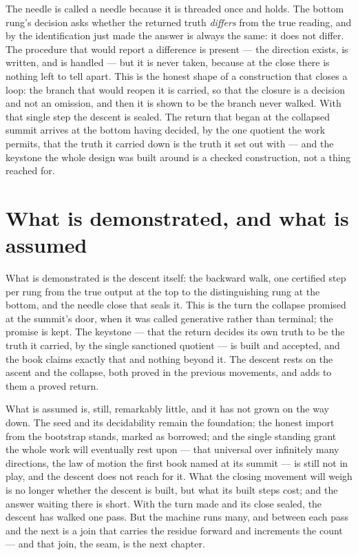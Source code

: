 The needle is called a needle because it is threaded once and holds. The bottom rung's decision asks
whether the returned truth \emph{differs} from the true reading, and by the identification just made the
answer is always the same: it does not differ. The procedure that would report a difference is present ---
the direction exists, is written, and is handled --- but it is never taken, because at the close there is
nothing left to tell apart. This is the honest shape of a construction that closes a loop: the branch that
would reopen it is carried, so that the closure is a decision and not an omission, and then it is shown to
be the branch never walked. With that single step the descent is sealed. The return that began at the
collapsed summit arrives at the bottom having decided, by the one quotient the work permits, that the
truth it carried down is the truth it set out with --- and the keystone the whole design was built around
is a checked construction, not a thing reached for.

\section{What is demonstrated, and what is assumed}
\label{se:demonstrated-assumed-III1}

What is demonstrated is the descent itself: the backward walk, one certified step per rung from the true
output at the top to the distinguishing rung at the bottom, and the needle close that seals it. This is the
turn the collapse promised at the summit's door, when it was called generative rather than terminal; the
promise is kept. The keystone
--- that the return decides its own truth to be the truth it carried, by the single sanctioned quotient ---
is built and accepted, and the book claims exactly that and nothing beyond it. The descent rests on the
ascent and the collapse, both proved in the previous movements, and adds to them a proved return.

What is assumed is, still, remarkably little, and it has not grown on the way down. The seed and its
decidability remain the foundation; the honest import from the bootstrap stands, marked as borrowed; and
the single standing grant the whole work will eventually rest upon --- that universal over infinitely many
directions, the law of motion the first book named at its summit --- is still not in play, and the descent
does not reach for it. What the closing movement will weigh is no longer whether the descent is built, but
what its built steps cost; and the answer waiting there is short. With the turn made and its close sealed,
the descent has walked one pass. But the machine runs many, and between each pass and the next is a join
that carries the residue forward and increments the count --- and that join, the seam, is the next chapter.
